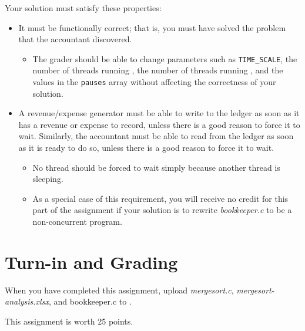 Your solution must satisfy these properties:
\begin{itemize}
\item It must be functionally correct; that is, you must have solved the
    problem that the accountant discovered.
    \begin{itemize}
    \item The grader should be able to change parameters such as
        \lstinline{TIME_SCALE}, the number of threads running
        , the number of threads running
        , and the values in the \lstinline{pauses} array
        without affecting the correctness of your solution.
    \end{itemize}
\item A revenue/expense generator must be able to write to the ledger as soon
    as it has a revenue or expense to record, unless there is a good reason to
    force it to wait. Similarly, the accountant must be able to read from the
    ledger as soon as it is ready to do so, unless there is a good reason to
    force it to wait.
    \begin{itemize}
    \item No thread should be forced to wait simply because another
        thread is sleeping.
    \item As a special case of this requirement, you will receive no credit for
        this part of the assignment if your solution is to rewrite
        \textit{bookkeeper.c} to be a non-concurrent program.
    \end{itemize}
\end{itemize}

\section*{Turn-in and Grading}

When you have completed this assignment, upload \textit{mergesort.c},
\textit{mergesort-analysis.xlsx}, and {bookkeeper.c} to \filesubmission.

This assignment is worth 25 points. \\

\begin{description}
\end{description}


